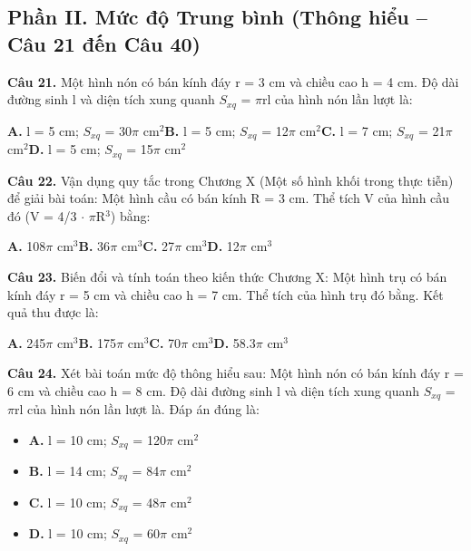 \documentclass[11pt,a4paper]{article}
\begin{document}
\subsection*{\color{accent} Phần II. Mức độ Trung bình (Thông hiểu -- Câu 21 đến Câu 40)}
\textbf{\color{primary} Câu 21.} Một hình nón có bán kính đáy r = 3 cm và chiều cao h = 4 cm. Độ dài đường sinh l và diện tích xung quanh $S_{xq}$ = $\pi$rl của hình nón lần lượt là:\par
\hspace*{1.5em}\textbf{A.} l = 5 cm; $S_{xq}$ = 30$\pi$ cm$^2$\quad\quad \textbf{B.} l = 5 cm; $S_{xq}$ = 12$\pi$ cm$^2$\quad\quad \textbf{C.} l = 7 cm; $S_{xq}$ = 21$\pi$ cm$^2$\quad\quad \textbf{D.} l = 5 cm; $S_{xq}$ = 15$\pi$ cm$^2$\par\vspace{2pt}
\textbf{\color{primary} Câu 22.} Vận dụng quy tắc trong Chương X (Một số hình khối trong thực tiễn) để giải bài toán: Một hình cầu có bán kính R = 3 cm. Thể tích V của hình cầu đó (V = 4/3 $\cdot$ $\pi$R$^3$) bằng:\par
\hspace*{1.5em}\textbf{A.} 108$\pi$ cm$^3$\quad\quad \textbf{B.} 36$\pi$ cm$^3$\quad\quad \textbf{C.} 27$\pi$ cm$^3$\quad\quad \textbf{D.} 12$\pi$ cm$^3$\par\vspace{2pt}
\textbf{\color{primary} Câu 23.} Biến đổi và tính toán theo kiến thức Chương X: Một hình trụ có bán kính đáy r = 5 cm và chiều cao h = 7 cm. Thể tích của hình trụ đó bằng. Kết quả thu được là:\par
\hspace*{1.5em}\textbf{A.} 245$\pi$ cm$^3$\quad\quad \textbf{B.} 175$\pi$ cm$^3$\quad\quad \textbf{C.} 70$\pi$ cm$^3$\quad\quad \textbf{D.} 58.3$\pi$ cm$^3$\par\vspace{2pt}
\textbf{\color{primary} Câu 24.} Xét bài toán mức độ thông hiểu sau: Một hình nón có bán kính đáy r = 6 cm và chiều cao h = 8 cm. Độ dài đường sinh l và diện tích xung quanh $S_{xq}$ = $\pi$rl của hình nón lần lượt là. Đáp án đúng là:\par
\begin{itemize}\setlength{\itemsep}{1pt}\setlength{\parskip}{0pt}
  \item[] \textbf{A.} l = 10 cm; $S_{xq}$ = 120$\pi$ cm$^2$
  \item[] \textbf{B.} l = 14 cm; $S_{xq}$ = 84$\pi$ cm$^2$
  \item[] \textbf{C.} l = 10 cm; $S_{xq}$ = 48$\pi$ cm$^2$
  \item[] \textbf{D.} l = 10 cm; $S_{xq}$ = 60$\pi$ cm$^2$
\end{itemize}\vspace{2pt}
\end{document}
